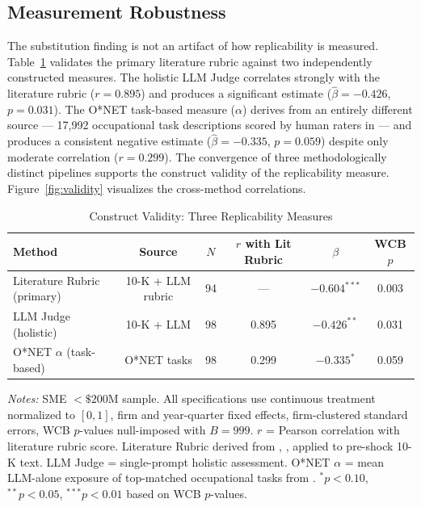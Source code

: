 \documentclass[12pt,a4paper]{article}
\begin{document}
\subsection{Measurement Robustness}

The substitution finding is not an artifact of how replicability is measured. Table~\ref{tab:measurement} validates the primary literature rubric against two independently constructed measures. The holistic LLM Judge correlates strongly with the literature rubric ($r = 0.895$) and produces a significant estimate ($\hat{\beta} = -0.426$, $p = 0.031$). The O*NET task-based measure ($\alpha$) derives from an entirely different source --- 17,992 occupational task descriptions scored by human raters in \citet{eloundou2024} --- and produces a consistent negative estimate ($\hat{\beta} = -0.335$, $p = 0.059$) despite only moderate correlation ($r = 0.299$). The convergence of three methodologically distinct pipelines supports the construct validity of the replicability measure. Figure~\ref{fig:validity} visualizes the cross-method correlations.

\begin{table}[H]
\centering
\caption{Construct Validity: Three Replicability Measures}
\label{tab:measurement}
\begin{tabular}{lccccc}
\toprule
Method & Source & $N$ & $r$ with Lit Rubric & $\beta$ & WCB $p$ \\
\midrule
Literature Rubric (primary) & 10-K + LLM rubric & 94 & --- & $-0.604^{***}$ & 0.003 \\
LLM Judge (holistic) & 10-K + LLM & 98 & 0.895 & $-0.426^{**}$ & 0.031 \\
O*NET $\alpha$ (task-based) & O*NET tasks & 98 & 0.299 & $-0.335^{*}$ & 0.059 \\
\bottomrule
\end{tabular}

\medskip
\small
\textit{Notes:} SME $<\$200$M sample. All specifications use continuous treatment normalized to $[0,1]$, firm and year-quarter fixed effects, firm-clustered standard errors, WCB $p$-values null-imposed with $B=999$. $r$ = Pearson correlation with literature rubric score. Literature Rubric derived from \citet{eloundou2024}, \citet{acemoglu2022}, \citet{brynjolfsson2023} applied to pre-shock 10-K text. LLM Judge = single-prompt holistic assessment. O*NET $\alpha$ = mean LLM-alone exposure of top-matched occupational tasks from \citet{eloundou2024}. $^{*}p<0.10$, $^{**}p<0.05$, $^{***}p<0.01$ based on WCB $p$-values.
\end{table}
\end{document}
